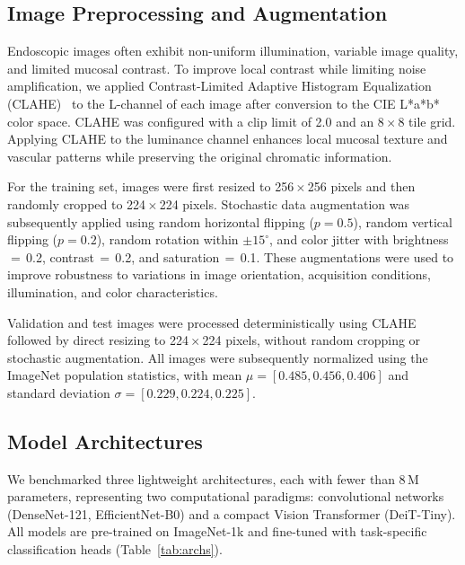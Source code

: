 \documentclass[11pt,a4paper]{article}
\begin{document}
\subsection{Image Preprocessing and Augmentation}
\label{sec:preproc}

Endoscopic images often exhibit non-uniform illumination, variable image
quality, and limited mucosal contrast. To improve local contrast while
limiting noise amplification, we applied Contrast-Limited Adaptive Histogram
Equalization (CLAHE)~\citep{Reza2004} to the L-channel of each image
after conversion to the CIE L*a*b* color space. CLAHE was configured with a
clip limit of 2.0 and an 8\,$\times$\,8 tile grid. Applying
CLAHE to the luminance channel enhances local mucosal texture and vascular
patterns while preserving the original chromatic information.

For the training set, images were first resized to 256\,$\times$\,256
pixels and then randomly cropped to 224\,$\times$\,224 pixels.
Stochastic data augmentation was subsequently applied using random horizontal
flipping ($p=0.5$), random vertical flipping ($p=0.2$), random rotation
within $\pm15^{\circ}$, and color jitter with brightness\,$=$\,0.2,
contrast\,$=$\,0.2, and saturation\,$=$\,0.1. These augmentations were used
to improve robustness to variations in image orientation, acquisition
conditions, illumination, and color characteristics.

Validation and test images were processed deterministically using CLAHE
followed by direct resizing to 224\,$\times$\,224 pixels, without
random cropping or stochastic augmentation. All images were subsequently
normalized using the ImageNet population statistics, with mean
$\mu=[0.485, 0.456, 0.406]$ and standard deviation
$\sigma=[0.229, 0.224, 0.225]$.

\subsection{Model Architectures}
\label{sec:models}

We benchmarked three lightweight architectures, each with fewer than 8\,M
parameters, representing two computational paradigms: convolutional networks
(DenseNet-121, EfficientNet-B0) and a compact Vision Transformer (DeiT-Tiny).
All models are pre-trained on ImageNet-1k and fine-tuned with task-specific
classification heads (Table~\ref{tab:archs}).
\end{document}
